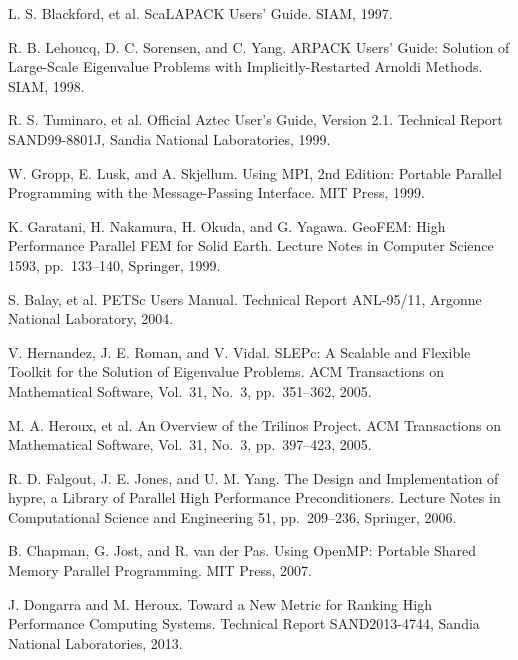 \documentclass[a4paper]{jarticle}
\begin{document}
{{\begin{thebibliography}{10}
L. S. Blackford, et al.
\newblock ScaLAPACK Users' Guide.
\newblock SIAM, 1997.

R. B. Lehoucq, D. C. Sorensen, and C. Yang.
\newblock ARPACK Users' Guide: Solution of Large-Scale Eigenvalue Problems with Implicitly-Restarted Arnoldi Methods. 
\newblock SIAM, 1998. 

R. S. Tuminaro, et al.
\newblock Official Aztec User's Guide, Version 2.1.
\newblock Technical Report SAND99-8801J, Sandia National Laboratories, 1999.

W. Gropp, E. Lusk, and A. Skjellum.
\newblock Using MPI, 2nd Edition: Portable Parallel Programming with the
	Message-Passing Interface.
\newblock MIT Press, 1999.

K. Garatani, H. Nakamura, H. Okuda, and G. Yagawa.
\newblock GeoFEM: High Performance Parallel FEM for Solid Earth.
\newblock Lecture Notes in Computer Science 1593, pp.\ 133--140, Springer, 1999.

S. Balay, et al.
\newblock PETSc Users Manual.
\newblock Technical Report ANL-95/11, Argonne National Laboratory, 2004.

V. Hernandez, J. E. Roman, and V. Vidal.
\newblock SLEPc: A Scalable and Flexible Toolkit for the Solution of
	Eigenvalue Problems.
\newblock ACM Transactions on Mathematical Software,  Vol.~31, No.~3, pp.\ 351--362, 2005.

M. A. Heroux, et al.
\newblock An Overview of the Trilinos Project.
\newblock ACM Transactions on Mathematical Software,  Vol.~31, No.~3, pp.\ 397--423, 2005.

R. D. Falgout, J. E. Jones, and U. M. Yang.
\newblock The Design and Implementation of hypre, a Library of Parallel
	High Performance Preconditioners.
\newblock Lecture Notes in Computational Science and Engineering 51, pp.\ 209--236, Springer, 2006.

B. Chapman, G. Jost, and R. van der Pas.
\newblock Using OpenMP: Portable Shared Memory Parallel Programming.
\newblock MIT Press, 2007.

J. Dongarra and M. Heroux.
\newblock Toward a New Metric for Ranking High Performance Computing Systems.
\newblock Technical Report SAND2013-4744, Sandia National Laboratories, 2013.

\end{thebibliography}

\newpage
\appendix
}}
\end{document}
